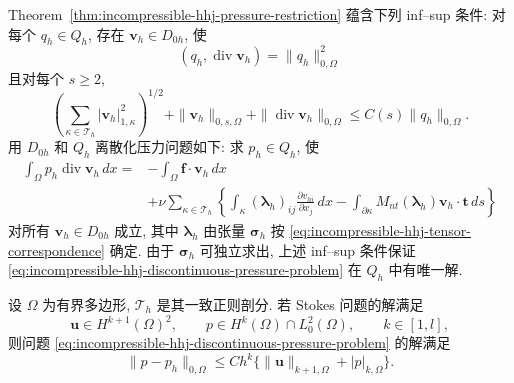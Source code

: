 Theorem~\ref{thm:incompressible-hhj-pressure-restriction}
蕴含下列 inf--sup 条件: 对每个 $q_h\in Q_h$, 存在
$\mathbf v_h\in D_{0h}$, 使
\[
(q_h,\operatorname{div}\mathbf v_h)=\|q_h\|_{0,\Omega}^2
\]
且对每个 $s\geq2$,
\[
\left(\sum_{\kappa\in\mathcal T_h}|\mathbf v_h|_{1,\kappa}^2\right)^{1/2}
+\|\mathbf v_h\|_{0,s,\Omega}
+\|\operatorname{div}\mathbf v_h\|_{0,\Omega}
\leq C(s)\|q_h\|_{0,\Omega}.
\]
用 $D_{0h}$ 和 $Q_h$ 离散化压力问题如下: 求 $p_h\in Q_h$, 使
\begin{equation}\label{eq:incompressible-hhj-discontinuous-pressure-problem}
\begin{split}
\int_\Omega p_h\operatorname{div}\mathbf v_h\,dx
={}&-\int_\Omega\mathbf f\cdot\mathbf v_h\,dx\\
&+\nu\sum_{\kappa\in\mathcal T_h}
\left\{\int_\kappa(\boldsymbol\lambda_h)_{ij}
\frac{\partial v_{hi}}{\partial x_j}\,dx
-\int_{\partial\kappa}M_{nt}(\boldsymbol\lambda_h)
\mathbf v_h\cdot\mathbf t\,ds\right\}
\end{split}
\end{equation}
对所有 $\mathbf v_h\in D_{0h}$ 成立, 其中
$\boldsymbol\lambda_h$ 由张量 $\boldsymbol\sigma_h$ 按
\eqref{eq:incompressible-hhj-tensor-correspondence} 确定.
由于 $\boldsymbol\sigma_h$ 可独立求出, 上述 inf--sup 条件保证
\eqref{eq:incompressible-hhj-discontinuous-pressure-problem}
在 $Q_h$ 中有唯一解.

\begin{Theorem}\label{thm:incompressible-hhj-discontinuous-pressure-error}
设 $\Omega$ 为有界多边形, $\mathcal T_h$ 是其一致正则剖分.
若 Stokes 问题的解满足
\[
\mathbf u\in H^{k+1}(\Omega)^2,
\qquad p\in H^k(\Omega)\cap L_0^2(\Omega),
\qquad k\in[1,l],
\]
则问题 \eqref{eq:incompressible-hhj-discontinuous-pressure-problem}
的解满足
\begin{equation}\label{eq:incompressible-hhj-discontinuous-pressure-error}
\|p-p_h\|_{0,\Omega}
\leq Ch^k\{\|\mathbf u\|_{k+1,\Omega}+|p|_{k,\Omega}\}.
\end{equation}
\end{Theorem}

